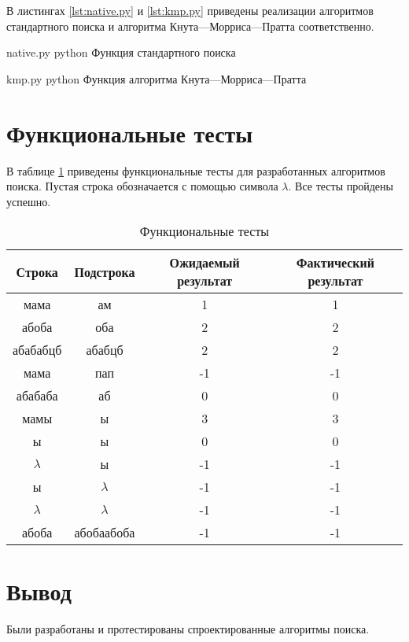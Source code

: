 В листингах \ref{lst:native.py} и \ref{lst:kmp.py} приведены реализации алгоритмов стандартного поиска и алгоритма Кнута---Морриса---Пратта соответственно.

\clearpage
{}
{native.py} %
{python} %
{Функция стандартного поиска} %

\clearpage

{kmp.py} %
{python} %
{Функция алгоритма Кнута---Морриса---Пратта} %

\clearpage

\section{Функциональные тесты}

В таблице \ref{tbl:func_tests} приведены функциональные тесты для разработанных алгоритмов поиска. Пустая строка обозначается с помощью символа $\lambda$. 
Все тесты пройдены успешно.

\begin{table}[ht]
	\small
	\begin{center}
		\begin{threeparttable}
			\caption{Функциональные тесты}
			\label{tbl:func_tests}
			\begin{tabular}{|c|c|c|c|}
				\hline
				\bfseries Строка
				& \bfseries Подстрока
				& \bfseries Ожидаемый результат
				& \bfseries Фактический результат \\ 
				\hline
				мама & ам & 1 & 1\\
				\hline
				абоба & оба & 2 & 2\\
				\hline
				абабабцб & абабцб & 2 & 2\\
				\hline
				мама & пап & -1 & -1\\
				\hline
				абабаба & аб & 0 & 0\\
				\hline
				мамы & ы & 3 & 3\\
				\hline
				ы & ы & 0 & 0\\
				\hline
				$\lambda$ & ы & -1 & -1\\
				\hline
				ы & $\lambda$ & -1 & -1\\
				\hline
				$\lambda$ & $\lambda$ & -1 & -1\\
				\hline
				абоба & абобаабоба & -1 & -1\\
				\hline
			\end{tabular}	
		\end{threeparttable}	
	\end{center}
\end{table}


\section*{Вывод}
Были разработаны и протестированы спроектированные алгоритмы поиска.